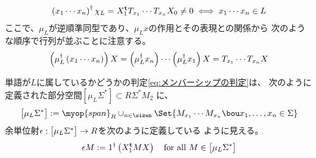 {\begin{equation}
\begin{split}
		\left({x_1\cdots x_n}\right)^\dag\chi_L
		= X_1^{\mathbf{t}} T_{x_1}\cdots T_{x_n}X_0 \neq 0 \iff x_1\cdots x_n\in L
	\end{split}\end{equation}
	ここで、$\mu_L$が逆順準同型であり、$\mu_Lx$の作用とその表現との関係から
	次のような順序で行列が並ぶことに注意する。
	\begin{equation*}\begin{split}
		\left({\mu_L^\dag\left({x_1\cdots x_n}\right)}\right)X = \left({\mu_L^\dag x_n}\right)
		\cdots\left({\mu_L^\dag {x_1}}\right)X = T_{x_1}\cdots T_{x_n}X
	\end{split}\end{equation*}

	単語が$L$に属しているかどうかの判定\eqref{eq:メンバーシップの判定}は、
	次のように定義された部分空間$[\mu_L\Sigma^*]\subset R\Sigma^*M_2$
	に、
	\begin{equation*}\begin{split}
		\gdyck{\mu_L\Sigma^*} := \myop{span}_R\cup_{n\in\sizen}
		\Set{M_{x_1}\cdots M_{x_n}\bou x_1,\dots,x_n\in\Sigma}
	\end{split}\end{equation*}
	余単位射$\epsilon:\bigl[{\mu_L\Sigma^*}\bigr]\to R$を次のように定義している
	ように見える。
	\begin{equation*}\begin{split}
		\epsilon M := 1^\dag\left({X_1^{\mathbf{t}} MX}\right)
		\quad\text{for all } M\in\bigl[{\mu_L\Sigma^*}\bigr]
	\end{split}\end{equation*}
}
